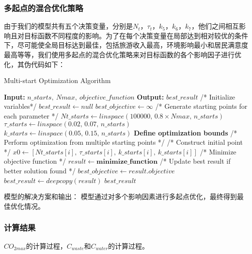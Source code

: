 \documentclass[12pt]{article}  %
\begin{document}
\subsubsection{多起点的混合优化策略}
由于我们的模型共有五个决策变量，分别是\(N_t\)，\(\tau_t\)，\(k_5\)，\(k_6\)，\(k_7\)，他们之间相互影响且对目标函数不同程度的影响。为了在每个决策变量在局部达到相对较优的条件下，尽可能使全局目标达到最佳，包括旅游收入最高，环境影响最小和居民满意度最高等等，我们使用多起点的混合优化策略来对目标函数的各个影响因子进行优化，其伪代码如下：
\begin{algorithm}
	\caption{Multi-start Optimization Algorithm}
	\begin{algorithmic}[1]
		\STATE \textbf{Input:} $n\_starts,\ Nmax,\ objective\_function$
		\STATE \textbf{Output:} $best\_result$
		\vspace{0.2cm}
		\STATE /* Initialize variables*/
		\STATE $best\_result\leftarrow null$
		\STATE $best\_objective\leftarrow \infty$
		\STATE /* Generate starting points for each parameter */
		\STATE $Nt\_starts\leftarrow linspace(100000,\,0.8\times Nmax,\,n\_starts)$
		\STATE $\tau\_starts\leftarrow linspace(0.02,\,0.07,\,n\_starts)$
		\STATE $k\_starts\leftarrow linspace(0.05,\,0.15,\,n\_starts)$
		\vspace{0.2cm}
		\STATE \textbf{Define optimization bounds}
		\vspace{0.2cm}
		\STATE /* Perform optimization from multiple starting points */
		\STATE /* Construct initial point */
		\STATE $x0\leftarrow [Nt\_starts[i],\ \tau\_starts[i],\ k\_starts[i],\ k\_starts[i]]$
		\STATE /* Minimize objective function */
		\STATE $result\leftarrow \textbf{minimize\_function}$
		\STATE /* Update best result if better solution found */
		\STATE $best\_objective\leftarrow result.objective$
		\STATE $best\_result\leftarrow deepcopy(result)$
		\ENDIF
		\ENDFOR
		\vspace{0.2cm}
		\RETURN $best\_result$
	\end{algorithmic}
\end{algorithm}

模型的解决方案和输出： 模型通过对多个影响因素进行多起点优化，最终得到最佳优化情况。
\subsubsection{计算结果}
$CO_{2max}$的计算过程，$C_{waste}$和$C_{water}$的计算过程。
\end{document}
